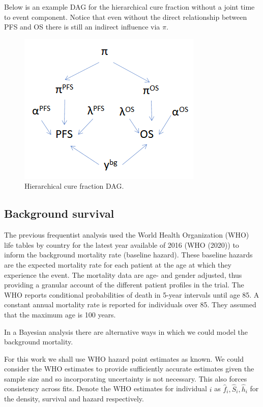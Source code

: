 \documentclass[
]{article}
\begin{document}
Below is an example DAG for the hierarchical cure fraction without a
joint time to event component. Notice that even without the direct
relationship between PFS and OS there is still an indirect influence via
\(\pi\).

\begin{figure}

{\centering \includegraphics[width=0.4\linewidth]{hierarchical_DAG} 

}

\caption{\label{fig:hier_dag} Hierarchical cure fraction DAG.}\label{fig:unnamed-chunk-2}
\end{figure}

\hypertarget{background-survival}{%
\subsection{Background survival}\label{background-survival}}

The previous frequentist analysis used the World Health Organization
(WHO) life tables by country for the latest year available of 2016 (WHO
(2020)) to inform the background mortality rate (baseline hazard). These
baseline hazards are the expected mortality rate for each patient at the
age at which they experience the event. The mortality data are age- and
gender adjusted, thus providing a granular account of the different
patient profiles in the trial. The WHO reports conditional probabilities
of death in 5-year intervals until age 85. A constant annual mortality
rate is reported for individuals over 85. They assumed that the maximum
age is 100 years.

In a Bayesian analysis there are alternative ways in which we could
model the background mortality.

For this work we shall use WHO hazard point estimates as known. We could
consider the WHO estimates to provide sufficiently accurate estimates
given the sample size and so incorporating uncertainty is not necessary.
This also forces consistency across fits. Denote the WHO estimates for
individual \(i\) as \(\hat{f}_i, \hat{S}_i, \hat{h}_i\) for the density,
survival and hazard respectively.
\end{document}

